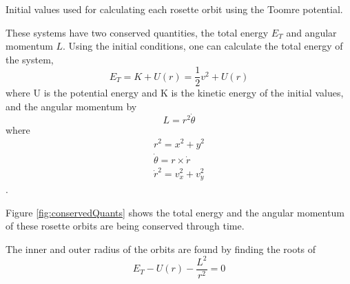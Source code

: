 \begin{table}
  \begin{center}
    \caption{Initial values used for calculating each rosette orbit using the Toomre potential.}
    \label{tab:ToomreOrbits}
  \end{center}
\end{table}

These systems have two conserved quantities, the total energy $E_T$ and angular momentum $L$. Using the initial conditions, one can calculate the total energy of the system,
\begin{equation}
    E_T=K + U(r) = \frac{1}{2}v^2 + U(r)
\end{equation}
where U is the potential energy and K is the kinetic energy of the initial values, and the angular momentum by
\begin{equation}
    L=r^2\Dot{\theta}
\end{equation}
where 
\begin{align}
    r^2 = x^2 + y^2\\
    \Dot{\theta} = r \times \dot{r}\\
    \dot{r}^2 = v_x^2 + v_y^2
\end{align}.

Figure \ref{fig:conservedQuants} shows the total energy and the angular momentum of these rosette orbits are being conserved through time. 

The inner and outer radius of the orbits are found by finding the roots of
\begin{equation}
    E_T - U(r) - \frac{L^2}{r^2} = 0
\end{equation}


